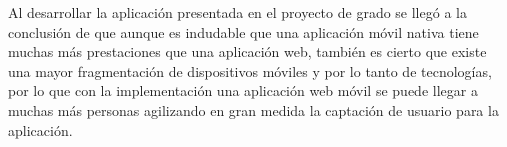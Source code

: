 Al desarrollar la aplicación presentada en el proyecto de grado se llegó a la conclusión de que aunque
es indudable que una aplicación móvil nativa tiene muchas más prestaciones que una aplicación web, también es cierto que existe una mayor fragmentación de dispositivos móviles y  por lo tanto de tecnologías, por lo que con la implementación una aplicación web móvil se puede llegar a muchas más personas agilizando en gran medida la captación de usuario para la aplicación.




%
%
%
%
%

